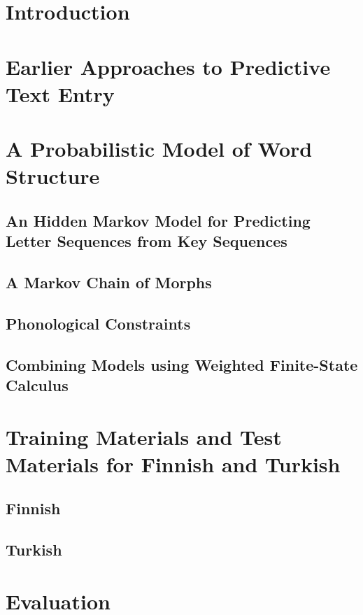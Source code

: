 \documentclass{llncs}
\begin{document}
\section{Introduction}

\section{Earlier Approaches to Predictive Text Entry}

\section{A Probabilistic Model of Word Structure}

\subsection{An Hidden Markov Model for Predicting Letter Sequences from Key Sequences}

\subsection{A Markov Chain of Morphs}

\subsection{Phonological Constraints}

\subsection{Combining Models using Weighted Finite-State Calculus}

\section{Training Materials and Test Materials for Finnish and Turkish}

\subsection{Finnish}

\subsection{Turkish}

\section{Evaluation}
\end{document}
